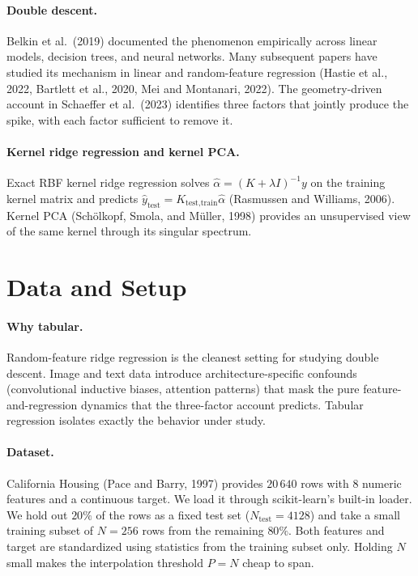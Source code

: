 \documentclass{article}
\begin{document}
\paragraph{Double descent.}
Belkin et al.\ (2019) documented the phenomenon empirically across linear models, decision trees, and neural networks. Many subsequent papers have studied its mechanism in linear and random-feature regression (Hastie et al., 2022, Bartlett et al., 2020, Mei and Montanari, 2022). The geometry-driven account in Schaeffer et al.\ (2023) identifies three factors that jointly produce the spike, with each factor sufficient to remove it.

\paragraph{Kernel ridge regression and kernel PCA.}
Exact RBF kernel ridge regression solves $\hat{\alpha} = (K + \lambda I)^{-1} y$ on the training kernel matrix and predicts $\hat{y}_{\text{test}} = K_{\text{test}, \text{train}} \hat{\alpha}$ (Rasmussen and Williams, 2006). Kernel PCA (Sch\"olkopf, Smola, and M\"uller, 1998) provides an unsupervised view of the same kernel through its singular spectrum.

\section{Data and Setup}

\paragraph{Why tabular.}
Random-feature ridge regression is the cleanest setting for studying double descent. Image and text data introduce architecture-specific confounds (convolutional inductive biases, attention patterns) that mask the pure feature-and-regression dynamics that the three-factor account predicts. Tabular regression isolates exactly the behavior under study.

\paragraph{Dataset.}
California Housing (Pace and Barry, 1997) provides $20\,640$ rows with 8 numeric features and a continuous target. We load it through scikit-learn's built-in loader. We hold out $20\%$ of the rows as a fixed test set ($N_{\text{test}} = 4128$) and take a small training subset of $N = 256$ rows from the remaining $80\%$. Both features and target are standardized using statistics from the training subset only. Holding $N$ small makes the interpolation threshold $P = N$ cheap to span.
\end{document}
